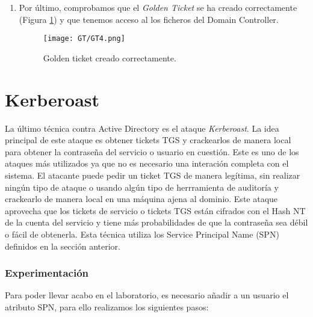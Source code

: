 \begin{enumerate}
\item Por último, comprobamos que el {\it Golden Ticket} se ha creado correctamente (Figura \ref{GT4}) y que tenemos acceso al los ficheros del Domain Controller.
\begin{figure}[H] %
\begin{center}
\texttt{[image: GT/GT4.png]}
\end{center}
\caption{Golden ticket creado correctamente.}
\label{GT4}
\end{figure}

\end{enumerate}

\section{Kerberoast}

La último técnica contra Active Directory es el ataque {\it Kerberoast}. La idea principal de este ataque es obtener tickets TGS y crackearlos de manera local para obtener la contraseña del servicio o usuario en cuestión. Este es uno de los ataques más utilizados ya que no es necesario una interación completa con el sistema. El atacante puede pedir un ticket TGS de manera legítima, sin realizar ningún tipo de ataque o usando algún tipo de herrramienta de auditoría y crackearlo de manera local en una máquina ajena al dominio. Este ataque aprovecha que los tickets de servicio o tickets TGS están cifrados con el Hash NT de la cuenta del servicio y tiene más probabilidades de que la contraseña sea débil o fácil de obtenerla. Esta técnica utiliza los Service Principal Name (SPN)~\cite{Capitulo4:SPN} definidos en la sección anterior. 

\subsubsection{Experimentación}

Para poder llevar acabo en el laboratorio, es necesario añadir a un usuario el atributo SPN, para ello realizamos los siguientes pasos:

